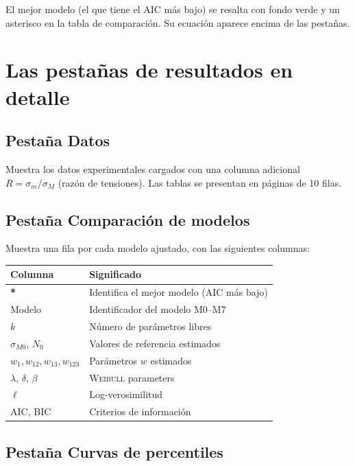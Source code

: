 \documentclass[11pt,a4paper]{article}
\newcommand{\sm}{\ensuremath{\sigma_m}}
\newcommand{\sM}{\ensuremath{\sigma_M}}
\newcommand{\sMzero}{\ensuremath{\sigma_{M0}}}
\newcommand{\Nzero}{\ensuremath{N_0}}
\newcommand{\Weibull}{\textsc{Weibull}}
\begin{document}
El mejor modelo (el que tiene el AIC más bajo) se resalta con fondo verde y un asterisco en la tabla de comparación. Su ecuación aparece encima de las pestañas.

\section{Las pestañas de resultados en detalle}

\subsection{Pestaña Datos}

Muestra los datos experimentales cargados con una columna adicional $R = \sm/\sM$ (razón de tensiones). Las tablas se presentan en páginas de 10 filas.

\subsection{Pestaña Comparación de modelos}

Muestra una fila por cada modelo ajustado, con las siguientes columnas:
\begin{center}
\begin{tabular}{ll}
\toprule
\textbf{Columna} & \textbf{Significado} \\
\midrule
\textbf{*} & Identifica el mejor modelo (AIC más bajo) \\
Modelo & Identificador del modelo M0--M7 \\
$k$ & Número de parámetros libres \\
$\sMzero$, $\Nzero$ & Valores de referencia estimados \\
$w_1,w_{12},w_{13},w_{123}$ & Parámetros $w$ estimados \\
$\lambda$, $\delta$, $\beta$ & \Weibull{} parameters \\
$\ell$ & Log-verosimilitud \\
AIC, BIC & Criterios de información \\
\bottomrule
\end{tabular}
\end{center}

\subsection{Pestaña Curvas de percentiles}
\label{sec:charts}
\end{document}
